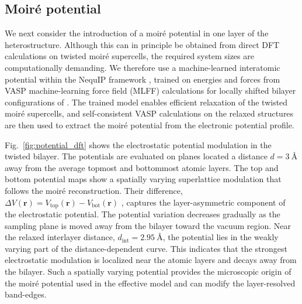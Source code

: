 \documentclass[aps, preprint, prb,]{revtex4-2}
\begin{document}

\subsection{Moir\'e potential} %

We next consider the introduction of a moir\'e potential in one layer of the heterostructure. Although this can in principle be obtained from direct DFT calculations on twisted moir\'e supercells, the required system sizes are computationally demanding. We therefore use a machine-learned interatomic potential within the NequIP framework \cite{Batzner2022NequIP}, trained on energies and forces from VASP machine-learning force field (MLFF) calculations for locally shifted bilayer configurations of . The trained model enables efficient relaxation of the twisted moir\'e supercells, and self-consistent VASP calculations on the relaxed structures are then used to extract the moir\'e potential from the electronic potential profile. 

Fig.~\ref{fig:potential_dft} shows the electrostatic potential modulation in the twisted  bilayer. 
The potentials are evaluated on planes located a distance $d=3~\text{\AA}$ away from the average topmost and bottommost atomic layers. 
The top and bottom potential maps show a spatially varying superlattice modulation that follows the moir\'e reconstruction. 
Their difference, $\Delta V(\mathbf{r}) =
V_{\mathrm{top}}(\mathbf{r}) - V_{\mathrm{bot}}(\mathbf{r})$ , captures the layer-asymmetric component of the electrostatic potential.
The potential variation decreases gradually as the sampling plane is moved away from the bilayer toward the vacuum region. 
Near the relaxed interlayer distance, $d_{\mathrm{int}}=2.95~\text{\AA}$, the potential lies in the weakly varying part of the distance-dependent curve. This indicates that the strongest electrostatic modulation is localized near the atomic layers and decays away from the bilayer. Such a spatially varying potential provides the microscopic origin of the moir\'e potential used in the effective model and can modify the layer-resolved band-edges. 
\end{document}
